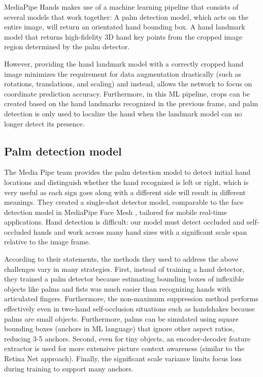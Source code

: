 MediaPipe Hands makes use of a machine learning pipeline that consists of several models that work together: A palm detection model, which acts on the entire image, will return an orientated hand bounding box. A hand landmark model that returns high-fidelity 3D hand key points from the cropped image region determined by the palm detector.

However, providing the hand landmark model with a correctly cropped hand image minimizes the requirement for data augmentation drastically (such as rotations, translations, and scaling) and instead, allows the network to focus on coordinate prediction accuracy. Furthermore, in this ML pipeline, crops can be created based on the hand landmarks recognized in the previous frame, and palm detection is only used to localize the hand when the landmark model can no longer detect its presence.
\subsection{Palm detection model}
The Media Pipe team provides the palm detection model to detect initial hand locations and distinguish whether the hand recognized is left or right, which is very useful as each sign goes along with a different side will result in different meanings. They created a single-shot detector model, comparable to the face detection model in MediaPipe Face Mesh \cite{MediaPipeFaceMesh}, tailored for mobile real-time applications. Hand detection is difficult: our model must detect occluded and self-occluded hands and work across many hand sizes with a significant scale span relative to the image frame.

According to their statements, the methods they used to address the above challenges vary in many strategies. First, instead of training a hand detector, they trained a palm detector because estimating bounding boxes of inflexible objects like palms and fists was much easier than recognizing hands with articulated fingers. Furthermore, the non-maximum suppression method performs effectively even in two-hand self-occlusion situations such as handshakes because palms are small objects. Furthermore, palms can be simulated using square bounding boxes (anchors in ML language) that ignore other aspect ratios, reducing 3-5 anchors. Second, even for tiny objects, an encoder-decoder feature extractor is used for more extensive picture context awareness (similar to the Retina Net approach). Finally, the significant scale variance limits focus loss during training to support many anchors.

